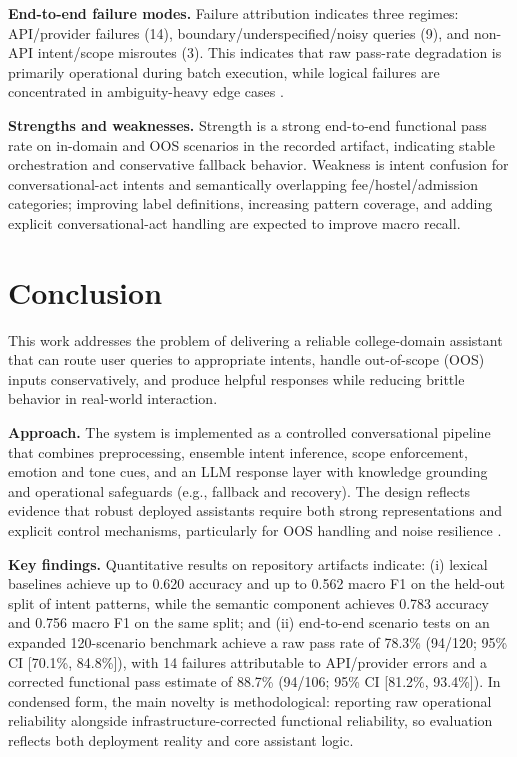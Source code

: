 \documentclass[12pt,onecolumn]{report}
\begin{document}
\textbf{End-to-end failure modes.} Failure attribution indicates three regimes: API/provider failures (14), boundary/underspecified/noisy queries (9), and non-API intent/scope misroutes (3). This indicates that raw pass-rate degradation is primarily operational during batch execution, while logical failures are concentrated in ambiguity-heavy edge cases \cite{belinkov2018synthetic,sun2020adversarial}.

\textbf{Strengths and weaknesses.} Strength is a strong end-to-end functional pass rate on in-domain and OOS scenarios in the recorded artifact, indicating stable orchestration and conservative fallback behavior. Weakness is intent confusion for conversational-act intents and semantically overlapping fee/hostel/admission categories; improving label definitions, increasing pattern coverage, and adding explicit conversational-act handling are expected to improve macro recall.

\chapter{Conclusion}
This work addresses the problem of delivering a reliable college-domain assistant that can route user queries to appropriate intents, handle out-of-scope (OOS) inputs conservatively, and produce helpful responses while reducing brittle behavior in real-world interaction.

\textbf{Approach.} The system is implemented as a controlled conversational pipeline that combines preprocessing, ensemble intent inference, scope enforcement, emotion and tone cues, and an LLM response layer with knowledge grounding and operational safeguards (e.g., fallback and recovery). The design reflects evidence that robust deployed assistants require both strong representations and explicit control mechanisms, particularly for OOS handling and noise resilience \cite{larson2019clinc150,casanueva2020banking77,belinkov2018synthetic}.

\textbf{Key findings.} Quantitative results on repository artifacts indicate: (i) lexical baselines achieve up to 0.620 accuracy and up to 0.562 macro F1 on the held-out split of intent patterns, while the semantic component achieves 0.783 accuracy and 0.756 macro F1 on the same split; and (ii) end-to-end scenario tests on an expanded 120-scenario benchmark achieve a raw pass rate of 78.3\% (94/120; 95\% CI [70.1\%, 84.8\%]), with 14 failures attributable to API/provider errors and a corrected functional pass estimate of 88.7\% (94/106; 95\% CI [81.2\%, 93.4\%]).
In condensed form, the main novelty is methodological: reporting raw operational reliability alongside infrastructure-corrected functional reliability, so evaluation reflects both deployment reality and core assistant logic.
\end{document}
